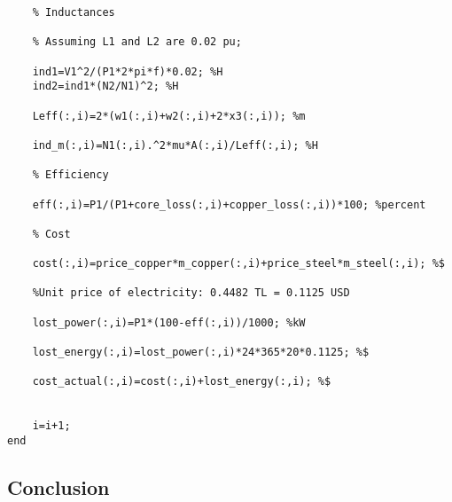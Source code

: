 \begin{verbatim}
    % Inductances

    % Assuming L1 and L2 are 0.02 pu;

    ind1=V1^2/(P1*2*pi*f)*0.02; %H
    ind2=ind1*(N2/N1)^2; %H

    Leff(:,i)=2*(w1(:,i)+w2(:,i)+2*x3(:,i)); %m

    ind_m(:,i)=N1(:,i).^2*mu*A(:,i)/Leff(:,i); %H

    % Efficiency

    eff(:,i)=P1/(P1+core_loss(:,i)+copper_loss(:,i))*100; %percent

    % Cost

    cost(:,i)=price_copper*m_copper(:,i)+price_steel*m_steel(:,i); %$

    %Unit price of electricity: 0.4482 TL = 0.1125 USD

    lost_power(:,i)=P1*(100-eff(:,i))/1000; %kW

    lost_energy(:,i)=lost_power(:,i)*24*365*20*0.1125; %$

    cost_actual(:,i)=cost(:,i)+lost_energy(:,i); %$


    i=i+1;
end
\end{verbatim}


\subsection*{Conclusion}


